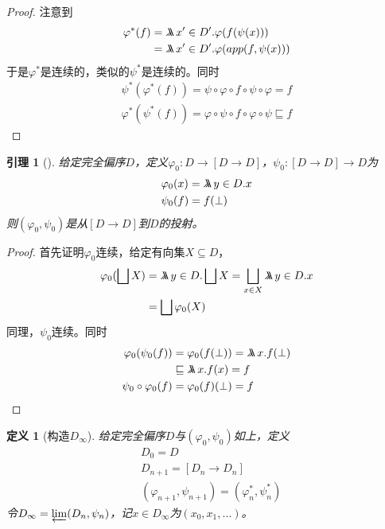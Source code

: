 \documentclass{jams-l}
\newtheorem{lemma}[theorem]{引理}
\newtheorem{definition}[theorem]{定义}
\begin{document}
\begin{proof}
注意到
\begin{align*}
\varphi^*(f)&=\metalambda x'\in D'.\varphi(f(\psi(x)))\\
&=\metalambda x'\in D'.\varphi(app(f,\psi(x)))
\end{align*}
于是\(\varphi^*\)是连续的，类似的\(\psi^*\)是连续的。同时
\begin{gather*}
\psi^*(\varphi^*(f))=\psi\circ\varphi\circ f\circ\psi\circ\varphi=f\\
\varphi^*(\psi^*(f))=\varphi\circ\psi\circ f\circ\varphi\circ\psi\sqsubseteq f
\end{gather*}
\end{proof}

\begin{lemma}[]
给定完全偏序\(D\)，定义\(\varphi_0:D\to[D\to D]\)，\(\psi_0:[D\to D]\to D\)为
\begin{align*}
&\varphi_0(x)=\metalambda y\in D.x\\
&\psi_0(f)=f(\bot)
\end{align*}
则\((\varphi_0,\psi_0)\)是从\([D\to D]\)到\(D\)的投射。
\end{lemma}

\begin{proof}
首先证明\(\varphi_0\)连续，给定有向集\(X\subseteq D\)，
\begin{align*}
\varphi_0(\bigsqcup X)&=\metalambda y\in D.\bigsqcup X=\bigsqcup_{x\in X}\metalambda y\in D.x\\
&=\bigsqcup\varphi_0(X)
\end{align*}
同理，\(\psi_0\)连续。同时
\begin{align*}
\varphi_0(\psi_0(f))&=\varphi_0(f(\bot))=\metalambda x.f(\bot)\\
&\sqsubseteq\metalambda x.f(x)=f\\
\psi_0\circ\varphi_0(f)&=\varphi_0(f)(\bot)=f
\end{align*}
\end{proof}

\begin{definition}[构造\(D_\infty\)]
给定完全偏序\(D\)与\((\varphi_0,\psi_0)\)如上，定义
\begin{align*}
&D_0=D\\
&D_{n+1}=[D_n\to D_n]\\
&(\varphi_{n+1},\psi_{n+1})=(\varphi_n^*,\psi_n^*)
\end{align*}
令\(D_\infty=\varprojlim(D_n,\psi_n)\)，记\(x\in D_\infty\)为\((x_0,x_1,\dots)\)。
\end{definition}
\end{document}
